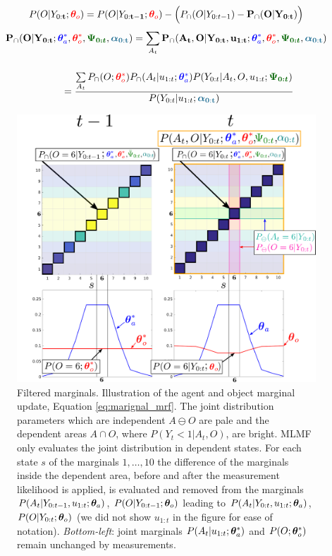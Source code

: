 \begin{equation}
 P(O|Y_{0:\mathbf{t}};\mathcolor{red}{\ThO}) = P(O|Y_{0:\mathbf{t-1}};\mathcolor{red}{\ThO}) - \Big(P_{\cap}(O|Y_{0:t-1}) -  \mathbf{P_{\cap}(O|Y_{0:t})}  \Big)   \label{eq:marignal_mrf}  
\end{equation}
\begin{align}
 &\mathbf{P_{\cap}(O|Y_{0:t}};\mathcolor{blue}{\ThAs},\mathcolor{red}{\ThOs},\mathcolor{dark-green}{\BPsi},\mathcolor{dark-blue}{\BAlph})  = \sum\limits_{A_t} \mathbf{P_{\cap}(A_t,O|Y_{0:t},u_{1:t}};\mathcolor{blue}{\ThAs},\mathcolor{red}{\ThOs},\mathcolor{dark-green}{\BPsi},\mathcolor{dark-blue}{\BAlph}) \nonumber \\[0.5cm]
 &\hspace*{2cm} =\frac{ \sum\limits_{A_t} P_{\cap}(O;\mathcolor{red}{\ThOs}) P_{\cap}(A_t|u_{1:t};\mathcolor{blue}{\ThAs})  P(Y_{0:t}|A_t,O,u_{1:t};\mathcolor{dark-green}{\BPsi})}{P(Y_{0:t}|u_{1:t};\mathcolor{dark-blue}{\BAlph})} \label{eq:marignal_mrf_2} 
\end{align}

\begin{figure}
\centering
\includegraphics[width=\textwidth]{./ch5-MLMF/Figures/explenation/marginal_cal_example_v2.pdf}
\caption{Filtered marginals. Illustration of the agent and object marginal update, Equation \ref{eq:marignal_mrf}. The joint 
distribution parameters which are independent $A \ominus O$ are pale and the dependent areas $A \cap O$, where $P(Y_t<1|A_t,O)$, are bright. MLMF only
evaluates the joint distribution in dependent states. For each state $s$ of the marginals $1,\dots,10$ the difference 
of the marginals inside the dependent area, before and after the measurement likelihood is applied, is evaluated and removed from the marginals 
$P(A_t|Y_{0:t-1},u_{1:t};\boldsymbol{\theta}_a)$, $P(O|Y_{0:t-1};\boldsymbol{\theta}_o)$ leading to $P(A_t|Y_{0:t},u_{1:t};\boldsymbol{\theta}_a)$, $P(O|Y_{0:t};\boldsymbol{\theta}_o)$ (we did not show $u_{1:t}$ in the figure for ease of notation). 
\textit{Bottom-left}: joint marginals $P(A_t|u_{1:t};\boldsymbol{\theta}^*_a)$ and $P(O;\boldsymbol{\theta}^*_o)$ remain unchanged by measurements.}
\label{fig:ch5:marginal_update}
\end{figure}

